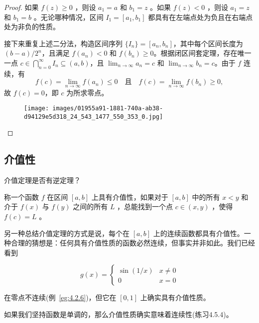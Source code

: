 \begin{proof}
如果 \(f\left( z\right)  \geq  0\) ，则设 \({a}_{1} = a\) 和 \({b}_{1} = z\) 。如果 \(f\left( z\right)  < 0\) ，则设 \({a}_{1} = z\) 和 \({b}_{1} = b\) 。无论哪种情况，区间 \({I}_{1} = \left\lbrack  {{a}_{1},{b}_{1}}\right\rbrack\) 都具有在左端点处为负且在右端点处为非负的性质。


接下来重复上述二分法，构造区间序列 \(\{I_n\} = [a_n, b_n]\)，其中每个区间长度为 \((b - a)/2^n\)，且满足 \(f(a_n) < 0\) 和 \(f(b_n) \geq 0\)。根据闭区间套定理，存在唯一一点 \(c \in \bigcap_{n=0}^\infty I_n \subseteq (a, b)\)，且 \(\lim_{n \to \infty} a_n = c\) 和 \(\lim_{n \to \infty} b_n = c\)。由于 \(f\) 连续，有  
\[
f(c) = \lim_{n \to \infty} f(a_n) \leq 0 \quad \text{且} \quad f(c) = \lim_{n \to \infty} f(b_n) \geq 0,
\]  
故 \(f(c) = 0\)，即 \(c\) 为所求零点。


\begin{figure}[h]
  \centering
  \texttt{[image: images/01955a91-1881-740a-ab38-d94129e5d318\_24\_543\_1477\_550\_353\_0.jpg]}
\end{figure}


\end{proof}


\subsection{介值性}

介值定理是否有逆定理？

\begin{Def}
  \label{def:4.5.3}
  称一个函数 \(f\) 在区间 \(\left\lbrack  {a,b}\right\rbrack\) 上具有介值性，如果对于 \(\left\lbrack  {a,b}\right\rbrack\) 中的所有 \(x < y\) 和介于 \(f\left( x\right)\) 与 \(f\left( y\right)\) 之间的所有 \(L\) ，总能找到一个点 \(c \in  \left( {x,y}\right)\) ，使得 \(f\left( c\right)  = L\) 。
\end{Def}


另一种总结介值定理的方式是说，每个在 \(\left\lbrack  {a,b}\right\rbrack\) 上的连续函数都具有介值性。一种合理的猜想是：任何具有介值性质的函数必然连续，但事实并非如此。我们已经看到

\[
g\left( x\right)  = \left\{  \begin{array}{ll} \sin \left( {1/x}\right) & x \neq  0 \\  0 & x = 0 \end{array}\right.
\]

在零点不连续(例~\ref{eg:4.2.6})，但它在 \(\left\lbrack  {0,1}\right\rbrack\) 上确实具有介值性质。

如果我们坚持函数是单调的，那么介值性质确实意味着连续性(练习4.5.4)。

